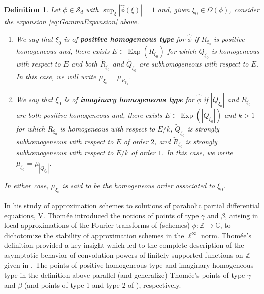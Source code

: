 \documentclass[11pt, letter]{book}
\newtheorem{definition}[theorem]{Definition}
\newcommand\Exp{\operatorname{Exp}}
\begin{document}
\begin{framed}
\begin{definition}\label{def:Types}
Let $\phi\in\mathcal{S}_d$ with $\sup_{\xi}|\widehat{\phi}(\xi)|=1$ and, given $\xi_0\in\Omega(\phi)$, consider the expansion \eqref{eq:GammaExpansion} above.
\begin{enumerate}
    \item We say that $\xi_0$ is of \textbf{positive homogeneous type} for $\widehat{\phi}$ if $R_{\xi_0}$ is positive homogeneous and, there exists $E\in \Exp(R_{\xi_0})$ for which $Q_{\xi_0}$ is homogeneous with respect to $E$ and both $\widetilde{R}_{\xi_0}$ and $\widetilde{Q}_{\xi_0}$ are subhomogeneous with respect to $E$. In this case, we will write  $\mu_{\xi_0}=\mu_{R_{\xi_0}}$.
\item We say that $\xi_0$ is of \textbf{imaginary homogeneous type} for $\widehat{\phi}$ if $|Q_{\xi_0}|$ and $R_{\xi_0}$ are both positive homogeneous and, there exists $E\in\Exp(|Q_{\xi_0}|)$ and $k>1$ for which $R_{\xi_0}$ is homogeneous with respect to $E/k$, $\widetilde{Q}_{\xi_0}$ is strongly subhomogeneous with respect to $E$ of order $2$, and $\widetilde{R}_{\xi_0}$ is strongly subhomogeneous with respect to $E/k$ of order $1$. In this case, we write $\mu_{\xi_0}=\mu_{|Q_{\xi_0}|}$.
\end{enumerate}
In either case, $\mu_{\xi_0}$ is said to be the homogeneous order associated to $\xi_0$.
\end{definition}
\end{framed}

\noindent In his study of approximation schemes to solutions of parabolic partial differential equations, V. Thom\'{e}e introduced the notions of points of type $\gamma$ and $\beta$, arising in local approximations of the Fourier transforms of (schemes) $\phi:\mathbb{Z}\to\mathbb{C}$, to dichotomize the stability of approximation schemes in the $\ell^\infty$ norm\cite{thomee_stability_1965}. Thom\'{e}e's definition provided a key insight which led to the complete description of the asymptotic behavior of convolution powers of finitely supported functions on $\mathbb{Z}$ given in \cite{randles_convolution_2015}. The points of positive homogeneous type and imaginary homogeneous type in the definition above parallel (and generalize) Thom\'{e}e's points of type $\gamma$ and $\beta$ (and points of type 1 and type 2 of \cite{randles_convolution_2015}), respectively.\\
\end{document}
